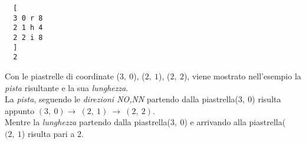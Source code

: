 \documentclass{article}
\begin{document}
\begin{itemize}
\begin{minipage}[t]{0.45\textwidth}
  \begin{itemize}
  \begin{verbatim}
  [
  3 0 r 8
  2 1 h 4
  2 2 i 8
  ]
  2
  \end{verbatim}
  \end{itemize}
  \end{minipage}
  Con le piastrelle di coordinate (\(3,\ 0\)), (\(2,\ 1\)), (\(2,\ 2\)), viene mostrato nell'esempio la \textit{pista} risultante e la sua \textit{lunghezza}.\\ 
  La \textit{pista}, seguendo le \textit{direzioni NO,NN} partendo dalla piastrella(\(3,\ 0\)) risulta appunto \((3,\ 0) \rightarrow\ (2,\ 1)\ \rightarrow\ (2,\ 2)\).\\
  Mentre la \textit{lunghezza} partendo dalla piastrella(\(3,\ 0\)) e arrivando alla piastrella(\((2,\ 1\)) risulta pari a \(2\).

\end{itemize}
  
\end{document}

